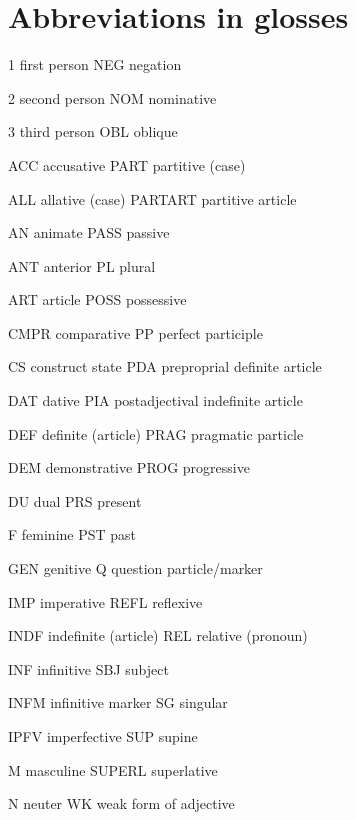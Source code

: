 
\chapter[Abbreviations in glosses]{Abbreviations in glosses\footnotemark{}}

1  first person  NEG  negation

2  second person  NOM  nominative

3  third person  OBL  oblique

ACC  accusative  PART  partitive (case)

ALL  allative (case)  PARTART  partitive article

AN  animate  PASS  passive

ANT  anterior  PL  plural

ART  article  POSS  possessive

CMPR  comparative  PP  perfect participle

CS  construct state  PDA  preproprial definite article

DAT  dative  PIA  postadjectival indefinite article

DEF  definite (article)  PRAG  pragmatic particle

DEM  demonstrative  PROG  progressive

DU  dual  PRS  present

F  feminine  PST  past

GEN  genitive  Q  question particle/marker

IMP  imperative  REFL  reflexive

INDF  indefinite (article)  REL  relative (pronoun)

INF  infinitive  SBJ  subject

INFM  infinitive marker  SG  singular

IPFV  imperfective  SUP  supine

M  masculine  SUPERL  superlative

N  neuter  WK  weak form of adjective
